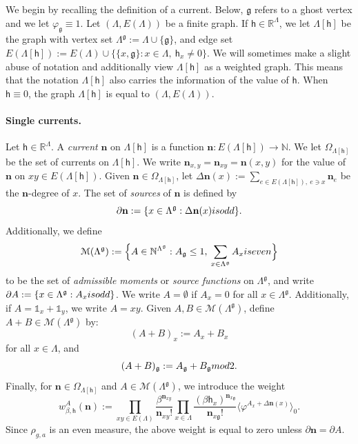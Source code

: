 \documentclass[11pt,a4paper]{article}
\theoremstyle{definition}
\numberwithin{equation}{section}
\newcommand\n{\mathbf{n}}
\newcommand\fg{\mathfrak{g}}
\newcommand\sn{\partial\mathbf{n}}
\begin{document}
We begin by recalling the definition of a current. Below, $\mathfrak{g}$ refers to a ghost vertex and we let $\varphi_\mathfrak g\equiv 1$. Let $(\Lambda,E(\Lambda))$ be a finite graph. If $\mathsf{h}\in \mathbb R^{\Lambda}$, we let $\Lambda[\mathsf{h}]$ be the graph with vertex set $\Lambda^{\mathfrak{g}}:=\Lambda\cup\{\mathfrak g\}$, and edge set $E(\Lambda[\mathsf{h}]):=E(\Lambda)\cup\{\{x,\fg\}:x\in \Lambda, \: \mathsf{h}_x\neq 0\}$. 
We will sometimes make a slight abuse of notation and additionally view $\Lambda[\mathsf{h}]$ as a weighted graph. This means that the notation $\Lambda[\mathsf{h}]$ also carries the information of the value of $\mathsf{h}$. When $\mathsf{h}\equiv 0$, the graph $\Lambda[\mathsf{h}]$ is equal to $(\Lambda,E(\Lambda))$.


\paragraph{Single currents.} Let $\mathsf{h}\in \mathbb R^\Lambda$. A \emph{current} $\n$ on $\Lambda[\mathsf{h}]$ is a function $\n: E(\Lambda[\mathsf{h}])\rightarrow \mathbb N$. We let $\Omega_{\Lambda[\mathsf{h}]}$ be the set of currents on $\Lambda[\mathsf{h}]$. We write $\n_{x,y}=\n_{xy}=\n(x,y)$ for the value of $\n$ on $xy\in E(\Lambda[\mathsf{h}])$. Given $\n \in \Omega_{\Lambda[\mathsf{h}]}$, let $\Delta\n(x):=\sum_{e\in E(\Lambda[\mathsf{h}]), \: e\ni x} \n_{e}$ be the $\n$-degree of $x$. The set of \emph{sources} of $\n$ is defined by
\begin{equation}
    \sn:=\{x\in \Lambda^\fg: \Delta\n(x)\textup{ is odd}\}.
\end{equation}
Additionally, we define
\begin{equation}
\mathcal{M}(\Lambda^\fg)
:=
\Big\lbrace A \in \mathbb N^{\Lambda^\fg}: A_\fg\leq 1,  \: \sum_{x\in \Lambda^\fg}A_x \textup{ is even}\Big\rbrace
\end{equation}
to be the set of \emph{admissible moments} or \emph{source functions}  on $\Lambda^\fg$, and write $\partial A:=\{x \in \Lambda^\fg : A_x \textup{ is odd}\}$. We write $A=\emptyset$ if $A_x=0$ for all $x\in \Lambda^\fg$. Additionally, if $A=\mathds{1}_x+\mathds{1}_y$, we write $A=xy$. Given $A,B\in \mathcal{M}(\Lambda^\fg)$, define $A+B \in \mathcal{M}(\Lambda^\fg)$ by:
\begin{equation}
(A+B)_x
:=
A_x+B_x
\end{equation}
for all $x \in \Lambda$, and
\begin{equation}
    (A+B)_\fg:=A_\fg+B_\fg \textup{ mod }2.
\end{equation}
Finally, for $\n\in \Omega_{\Lambda[\mathsf{h}]}$ and $A\in \mathcal{M}(\Lambda^\fg)$, we introduce the weight
\begin{equation}
    w^{A}_{\beta,\mathsf{h}}(\n):=\prod_{xy\in E(\Lambda)}\frac{\beta^{\n_{xy}}}{\n_{xy}!}\prod_{x\in \Lambda}\frac{(\beta\mathsf{h}_x)^{\n_{x\fg}}}{\n_{x\fg}!}\langle\varphi^{A_x+\Delta\n(x)}\rangle_0.
\end{equation}
Since $\rho_{g,a}$ is an even measure, the above weight is equal to zero unless $\sn=\partial A$.
\end{document}
